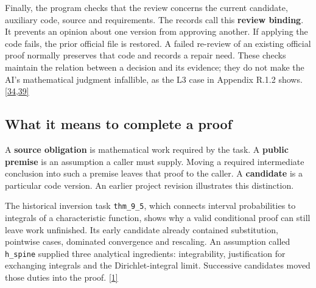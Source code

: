 Finally, the program checks that the review concerns the current candidate, auxiliary code, source and requirements. The records call this \textbf{review binding}. It prevents an opinion about one version from approving another. If applying the code fails, the prior official file is restored. A failed re-review of an existing official proof normally preserves that code and records a repair need. These checks maintain the relation between a decision and its evidence; they do not make the AI's mathematical judgment infallible, as the L3 case in Appendix R.1.2 shows. \hyperlink{ref-34}{\mbox{[34,39]}}

\subsection[What it means to complete a proof]{\texorpdfstring{\protect\hypertarget{section-1-3}{}What it means to complete a proof}{What it means to complete a proof}}
A \textbf{source obligation} is mathematical work required by the task. A \textbf{public premise} is an assumption a caller must supply. Moving a required intermediate conclusion into such a premise leaves that proof to the caller. A \textbf{candidate} is a particular code version. An earlier project revision illustrates this distinction.

The historical inversion task \nolinkurl{thm_9_5}, which connects interval probabilities to integrals of a characteristic function, shows why a valid conditional proof can still leave work unfinished. Its early candidate already contained substitution, pointwise cases, dominated convergence and rescaling. An assumption called \nolinkurl{h_spine} supplied three analytical ingredients: integrability, justification for exchanging integrals and the Dirichlet-integral limit. Successive candidates moved those duties into the proof. \hyperlink{ref-1}{\mbox{[1]}}

